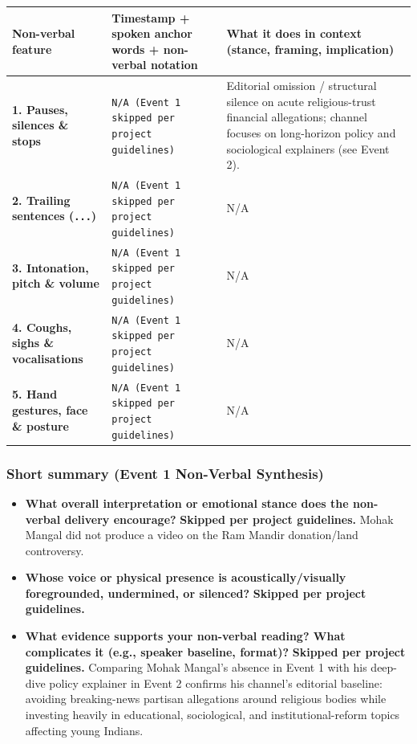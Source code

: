 \documentclass[10pt,a4paper]{article}
\begin{document}
\begin{longtable}{|p{}|p{}|p{}|}
\hline
Non-verbal feature & Timestamp + spoken anchor words + non-verbal notation & What it does in context (stance, framing, implication) \\ \hline \endhead
\textbf{1. Pauses, silences \& stops} & \texttt{N/A (Event 1 skipped per project guidelines)} & Editorial omission / structural silence on acute religious-trust financial allegations; channel focuses on long-horizon policy and sociological explainers (see Event 2). \\ \hline
\textbf{2. Trailing sentences (\texttt{...})} & \texttt{N/A (Event 1 skipped per project guidelines)} & N/A \\ \hline
\textbf{3. Intonation, pitch \& volume} & \texttt{N/A (Event 1 skipped per project guidelines)} & N/A \\ \hline
\textbf{4. Coughs, sighs \& vocalisations} & \texttt{N/A (Event 1 skipped per project guidelines)} & N/A \\ \hline
\textbf{5. Hand gestures, face \& posture} & \texttt{N/A (Event 1 skipped per project guidelines)} & N/A \\ \hline
\end{longtable}

\subsubsection*{Short summary (Event 1 Non-Verbal Synthesis)}

\begin{itemize}
  \item \textbf{What overall interpretation or emotional stance does the non-verbal delivery encourage?}
\textbf{Skipped per project guidelines.} Mohak Mangal did not produce a video on the Ram Mandir donation/land controversy.\par\smallskip
  \item \textbf{Whose voice or physical presence is acoustically/visually foregrounded, undermined, or silenced?}
\textbf{Skipped per project guidelines.}\par\smallskip
  \item \textbf{What evidence supports your non-verbal reading? What complicates it (e.g., speaker baseline, format)?}
\textbf{Skipped per project guidelines.} Comparing Mohak Mangal's absence in Event 1 with his deep-dive policy explainer in Event 2 confirms his channel's editorial baseline: avoiding breaking-news partisan allegations around religious bodies while investing heavily in educational, sociological, and institutional-reform topics affecting young Indians.\par\smallskip
\end{itemize}
\end{document}
